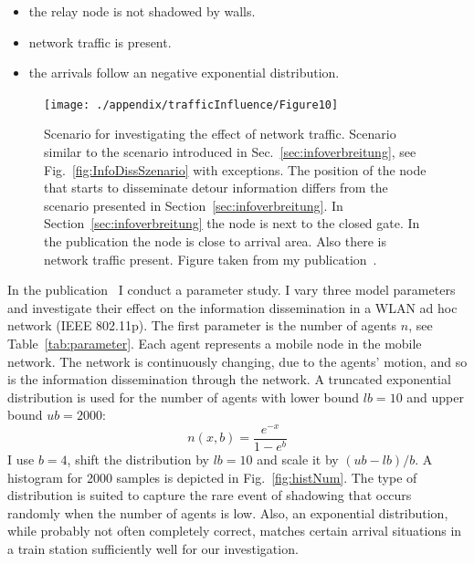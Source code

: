 \begin{itemize}
\item the relay node is not shadowed by walls. 
\item network traffic is present. 
\item the arrivals follow an negative exponential distribution. 
\end{itemize} 


\begin{figure}[hbt]
\centering
\texttt{[image: ./appendix/trafficInfluence/Figure10]}%
\caption[Scenario for investigating the effect of network traffic]{ Scenario for investigating the effect of network traffic. 
Scenario similar to the scenario introduced in Sec.~\ref{sec:infoverbreitung}, see Fig.~\ref{fig:InfoDissSzenario} with exceptions. The position of the node that starts to disseminate detour information differs from the scenario presented in Section~\ref{sec:infoverbreitung}.  In Section~\ref{sec:infoverbreitung} the node is next to the closed gate. In the publication the node is close to arrival area. Also there is network traffic present. Figure taken from my publication~\cite{mayr-2021-com}. }
\label{fig:scenarioOldVersionWithtraffic}%
\end{figure}


In the publication~\cite{mayr-2021-com} I conduct a parameter study. I vary three model parameters and investigate their effect on the information dissemination in a WLAN ad hoc network (IEEE 802.11p).
The first parameter is the number of agents $n$, see Table~\ref{tab:parameter}. Each agent represents a mobile node in the mobile network. The network is continuously changing,
due to the agents' motion,
and so is the information dissemination through the network. A truncated exponential distribution is used for the number of agents with lower bound $lb=10$ and upper bound $ub=2000$:
\begin{equation}
n(x,b) = \frac{e^{-x}} {1-e^{b}} %
\label{eq:expon}
\end{equation}
I use $b=4$, shift the distribution by $lb=10$ and scale it by $ ( ub-lb ) / b $. A histogram for 2000  samples is depicted in Fig.~\ref{fig:histNum}. The type of distribution is suited to capture the rare event of shadowing that occurs randomly when the number of agents is low. Also,  an exponential distribution, while probably not often completely correct, matches certain arrival situations in a train station sufficiently well for our investigation. 



